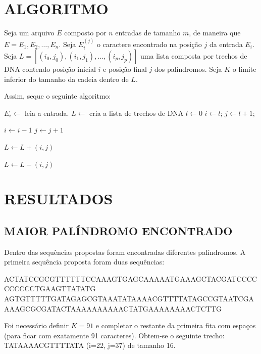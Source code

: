 \documentclass{report}
\begin{document}
\section{ALGORITMO}
Seja um arquivo $E$ composto por $n$ entradas de tamanho $m$, de maneira que $E = E_1, E_2, \dots, E_n$. Seja $E_i^{(j)}$ o caractere encontrado na posição $j$ da entrada $E_i$. Seja $L=[(i_0,j_0), (i_1,j_1), \dots, (i_p,j_p)]$ uma lista composta por trechos de DNA contendo posição inicial $i$ e posição final $j$ dos palíndromos. Seja $K$ o limite inferior do tamanho da cadeia dentro de $L$.

Assim, seque o seguinte algoritmo:

\begin{algorithmic}
    \State $E_i \gets$ leia a entrada.
    \State $L \gets$ cria a lista de trechos de DNA
    \State $l \gets 0$
            \State $i \gets l$;
            \State $j \gets l+1$;
            
                \State $i \gets i-1$
                \State $j \gets j+1$
            \EndWhile

                \State $L \gets L + (i, j)$
            \EndIf
        \EndIf
    \EndWhile
    
            \State $L \gets L - (i,j)$
        \EndIf
    \EndWhile

\EndWhile
\end{algorithmic}

\section{RESULTADOS}
\subsection{MAIOR PALÍNDROMO ENCONTRADO}
Dentro das sequências propostas foram encontradas diferentes palíndromos. A primeira sequência proposta foram duas sequências:

ACTATCCGCGTTTTTTCCAAAGTGAGCAAAAATGAAAGCTACGATCCCCCCCCCCTGAAGTTATATG
AGTGTTTTTGATAGAGCGTAAATATAAAACGTTTTATAGCCGTAATCGAAAAGCGCGATACTAAAAAAAAAACTATGAAAAAAAACTCTTG

Foi necessário definir $K = 91$ e completar o restante da primeira fita com espaços (para ficar com exatamente 91 caracteres). Obtem-se o seguinte trecho: TATAAAACGTTTTATA (i=22, j=37) de tamanho 16.
\end{document}

